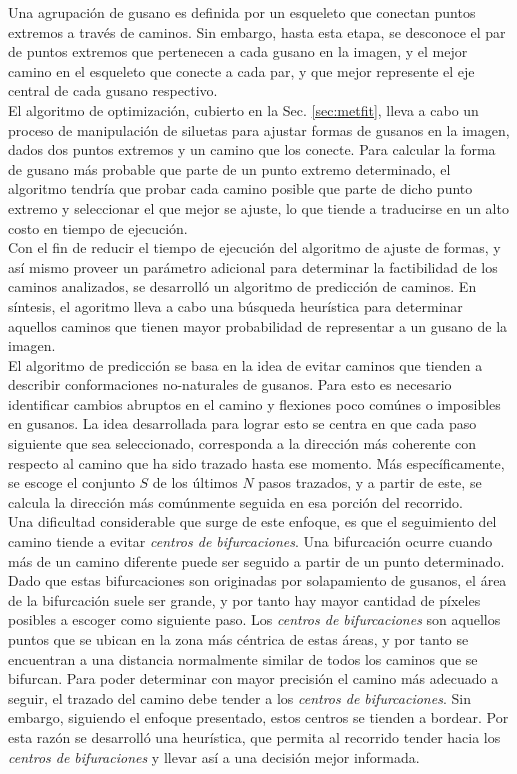 Una agrupaci\'on de gusano es definida por un esqueleto
que conectan puntos extremos a trav\'es de caminos. Sin embargo, hasta esta etapa,
se desconoce el par de puntos extremos que pertenecen a cada gusano en la imagen, y 
el mejor camino en el esqueleto
que conecte a cada par, y que mejor represente el eje central de cada gusano 
respectivo.\\

El algoritmo de optimizaci\'on, cubierto en la Sec. \ref{sec:metfit}, lleva a cabo un
proceso de manipulaci\'on de siluetas para ajustar formas de gusanos en la imagen, dados
dos puntos extremos y un camino que los conecte. Para calcular la forma de gusano m\'as probable
que parte de un punto extremo determinado, el algoritmo tendr\'ia que probar cada camino posible
que parte de dicho punto extremo y seleccionar el que mejor se ajuste, lo que tiende a traducirse  
en un alto costo en tiempo de ejecuci\'on.\\
Con el fin de reducir el tiempo de ejecuci\'on del algoritmo de ajuste de
formas, y as\'i mismo proveer un par\'ametro adicional para determinar la
factibilidad de los caminos analizados, se desarroll\'o un algoritmo de
predicci\'on de caminos. En s\'intesis, el agoritmo lleva a cabo una b\'usqueda
heur\'istica para determinar aquellos caminos que tienen mayor probabilidad
de representar a un gusano de la imagen.\\

El algoritmo de predicci\'on se basa en la idea de evitar caminos que
tienden a describir conformaciones no-naturales de gusanos. Para esto
es necesario identificar cambios abruptos en el camino y flexiones
poco com\'unes o imposibles en gusanos. La idea desarrollada para lograr
esto se centra en que cada paso siguiente que sea seleccionado, corresponda
a la direcci\'on m\'as coherente con respecto al camino que ha sido
trazado hasta ese momento. 
M\'as espec\'ificamente, se escoge el conjunto $S$ de los \'ultimos $N$ 
pasos trazados, y a partir de este, se calcula la direcci\'on m\'as com\'unmente
seguida en esa porci\'on del recorrido.\\

Una dificultad considerable que surge de este
enfoque, es que el seguimiento del camino tiende a evitar \emph{centros de bifurcaciones}.
Una bifurcaci\'on ocurre cuando m\'as de un camino diferente puede ser seguido a partir
de un punto determinado. Dado que estas bifurcaciones son originadas por solapamiento 
de gusanos, el \'area de la bifurcaci\'on suele ser grande, y por tanto hay mayor 
cantidad de p\'ixeles posibles a escoger como siguiente paso. Los \emph{centros de bifurcaciones}
son aquellos puntos que se ubican en la zona m\'as c\'entrica de estas \'areas, y por tanto
se encuentran a una distancia normalmente similar de todos los caminos que se bifurcan.
Para poder determinar con mayor precisi\'on el camino m\'as adecuado a seguir, el trazado del camino 
debe tender a los \emph{centros de bifurcaciones}. Sin embargo, siguiendo el enfoque presentado, estos
centros se tienden a bordear. Por esta raz\'on se desarroll\'o una heur\'istica, que permita
al recorrido tender hacia los \emph{centros de bifuraciones} y llevar as\'i a una 
decisi\'on mejor informada.\\

